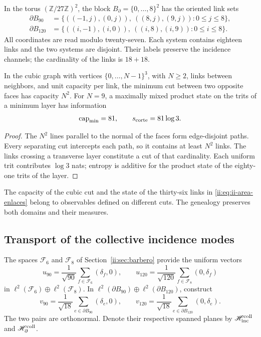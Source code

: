 In the torus \((\mathbb Z/27\mathbb Z)^2\), the block
\(B_\partial=\{0,\ldots,8\}^2\) has the oriented link sets
\begin{align}
 \partial B_{90}
 &=\{((-1,j),(0,j)),\ ((8,j),(9,j)):0\le j\le8\},\\
 \partial B_{120}
 &=\{((i,-1),(i,0)),\ ((i,8),(i,9)):0\le i\le8\}.
 \label{ii:eq:ii-area-enlaces}
\end{align}
All coordinates are read modulo twenty-seven. Each system contains eighteen links and the two systems are disjoint. Their labels preserve the incidence channels; the cardinality of the links is \(18+18\).

\begin{theorem}
\label{ii:thm:ii-area-corte-minimo}
In the cubic graph with vertices \(\{0,\ldots,N-1\}^3\), with
\(N\ge2\), links between neighbors, and unit capacity per link,
the minimum cut between two opposite faces has capacity \(N^2\).
For \(N=9\), a maximally mixed product state on the
trits of a minimum layer has information
\begin{equation}
 \operatorname{cap}_{\min}=81,\qquad s_{\rm corte}=81\log3.
 \label{ii:eq:ii-area-corte-informacion}
\end{equation}
\end{theorem}
\begin{proof}
The \(N^2\) lines parallel to the normal of the faces form edge-disjoint
paths. Every separating cut intercepts each path, so
it contains at least \(N^2\) links. The links crossing
a transverse layer constitute a cut of that cardinality. Each uniform trit
contributes \(\log3\) nats; entropy is additive for the product
state of the eighty-one trits of the layer.
\end{proof}

The capacity of the cubic cut and the state of the thirty-six links
in \eqref{ii:eq:ii-area-enlaces} belong to observables defined on
different cuts. The genealogy preserves both domains and their measures.

\subsection{Transport of the collective incidence modes}
\label{ii:sec:ii-area-transporte-colectivo}

The spaces \(\mathcal F_6\) and \(\mathcal F_8\) of
Section~\ref{ii:sec:barbero} provide the uniform vectors
\[
 u_{90}=\frac1{\sqrt{90}}\sum_{f\in\mathcal F_6}(\delta_f,0),
 \qquad
 u_{120}=\frac1{\sqrt{120}}\sum_{f\in\mathcal F_8}(0,\delta_f)
\]
in \(\ell^2(\mathcal F_6)\oplus\ell^2(\mathcal F_8)\).
In \(\ell^2(\partial B_{90})\oplus\ell^2(\partial B_{120})\),
construct
\[
 v_{90}=\frac1{\sqrt{18}}\sum_{e\in\partial B_{90}}(\delta_e,0),
 \qquad
 v_{120}=\frac1{\sqrt{18}}\sum_{e\in\partial B_{120}}(0,\delta_e).
\]
The two pairs are orthonormal. Denote their respective spanned planes
by \(\mathscr H_{\rm inc}^{\rm coll}\) and
\(\mathscr H_\partial^{\rm coll}\).


